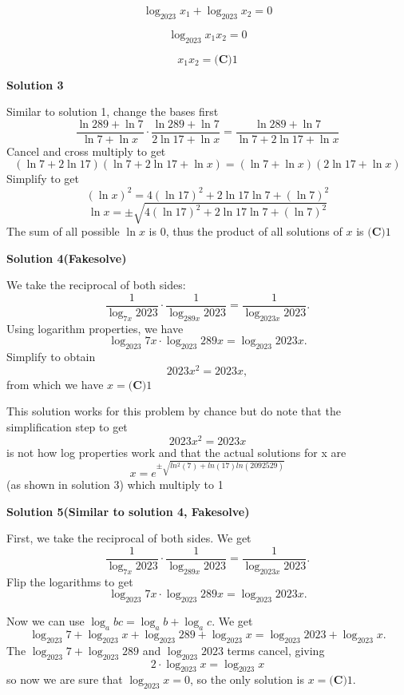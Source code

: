 \begin{enumerate}
 \[\log_{2023}{x_1}+\log_{2023}{x_2}=0\]

 \[\log_{2023}{x_1x_2}=0\]

 \[x_1x_2=\boxed{\textbf{(C)} 1}\]




\textbf{Solution 3}

Similar to solution 1, change the bases first
 \[\frac{\ln 289+\ln 7}{\ln7 + \ln{x}} \cdot \frac{\ln 289+\ln 7}{2\ln17 + \ln{x}} = \frac{\ln 289+\ln 7}{\ln7 + 2\ln17 + \ln{x}}\]Cancel and cross multiply to get
 \[(\ln7 + 2\ln17)(\ln7 + 2\ln17 + \ln{x}) = (\ln7 + \ln{x})(2\ln17 + \ln{x})\]Simplify to get
 \[(\ln{x})^2 = 4(\ln17)^2 + 2\ln17\ln7 + (\ln7)^2\]
 \[\ln{x} = \pm \sqrt{4(\ln17)^2 + 2\ln17\ln7 + (\ln7)^2}\]The sum of all possible $\ln{x}$ is 0, thus the product of all solutions of $x$ is $\boxed{\textbf{(C)} 1}$




\textbf{Solution 4(Fakesolve)}

We take the reciprocal of both sides:
 \[\frac{1}{\log_{7x}2023}\cdot \frac{1}{\log_{289x}2023}=\frac{1}{\log_{2023x}2023}.\] Using logarithm properties, we have 
 \[\log_{2023}7x\cdot \log_{2023}289x=\log_{2023}2023x.\] Simplify to obtain 
 \[2023x^2=2023x,\] from which we have $x=\boxed{\textbf{(C)} 1}$

 This solution works for this problem by chance but do note that the simplification step to get 
 \[2023x^2=2023x\]is not how log properties work and that the actual solutions for x are 
 \[x = e^{ \pm \sqrt{ln^2(7)+ln(17)ln(2092529)}}\] (as shown in solution 3) which multiply to 1

 



\textbf{Solution 5(Similar to solution 4, Fakesolve)}

First, we take the reciprocal of both sides. We get 
 \[\frac{1}{\log_{7x}2023}\cdot \frac{1}{\log_{289x}2023}=\frac{1}{\log_{2023x}2023}.\]Flip the logarithms to get 
 \[\log_{2023}7x\cdot \log_{2023}289x=\log_{2023}2023x.\]

 Now we can use $\log_{a}bc=\log_{a}b+\log_{a}c$. We get 
 \[\log_{2023}7+\log_{2023}x+\log_{2023}289+\log_{2023}x=\log_{2023}2023+\log_{2023}x.\] The $\log_{2023}7+\log_{2023}289$ and $\log_{2023}2023$ terms cancel, giving 
 \[2\cdot\log_{2023}x=\log_{2023}x\] so now we are sure that $\log_{2023}x=0$, so the only solution is $x=\boxed{\textbf{(C)} 1}$.

 




\end{enumerate}
